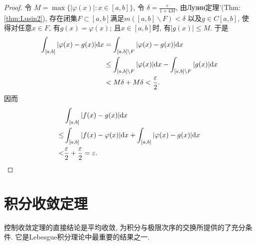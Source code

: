 \begin{proof}
 \par
令 $M=\max \{|\varphi(x)|: x \in[a, b]\}$, 
令 $\delta=\frac{\varepsilon}{1+4 M}$, 
由Лузин定理'(Thm:\ref{thm:Lusin2}), 
存在闭集$F \subset[a, b]$满足$m([a, b] \backslash F)<\delta$
以及$g \in C[a, b]$, 使得对任意$x \in F$, 有$g(x)=\varphi(x)$; 
且$x \in[a, b]$时, 有$|g(x)| \leq M$. 
于是
$$
\begin{aligned}
	\int_{[a, b]}|\varphi(x)-g(x)| \mathrm{d} x
	&= \int_{[a, b] \backslash F}|\varphi(x)-g(x)| \mathrm{d} x \\
	&\leq \int_{[a, b] \backslash F}|\varphi(x)| \mathrm{d} x - \int_{[a, b] \backslash F}|g(x)| \mathrm{d} x \\
	&< M \delta + M \delta < \frac{\varepsilon}{2}.
\end{aligned}
$$
因而
$$
\begin{aligned}
	     & \int_{[a,b]} |f(x) - g(x)| \mathrm{d} x \\
	\leq & \int_{[a, b]}|f(x)-\varphi(x)| \mathrm{d} x + \int_{[a, b]}|\varphi(x)-g(x)| \mathrm{d} x \\
	<    & \frac{\varepsilon}{2} + \frac{\varepsilon}{2} = \varepsilon.
\end{aligned}
$$
\end{proof}


































%
%
\section{积分收敛定理}

控制收敛定理的直接结论是平均收敛, 为积分与极限次序的交换所提供的了充分条件. 
它是Lebesgue积分理论中最重要的结果之一.

